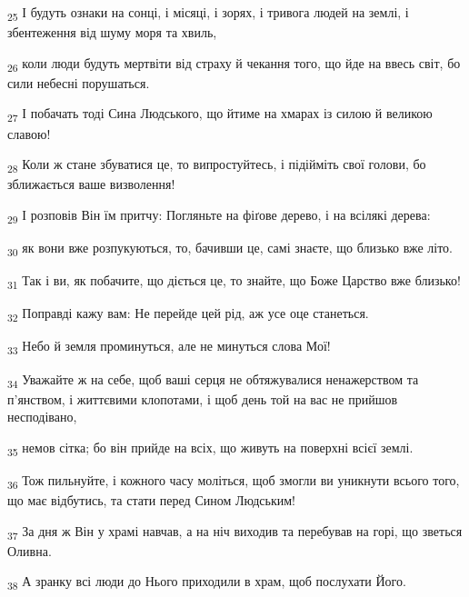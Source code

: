 \begin{tcolorbox}
\textsubscript{25} І будуть ознаки на сонці, і місяці, і зорях, і тривога людей на землі, і збентеження від шуму моря та хвиль,
\end{tcolorbox}
\begin{tcolorbox}
\textsubscript{26} коли люди будуть мертвіти від страху й чекання того, що йде на ввесь світ, бо сили небесні порушаться.
\end{tcolorbox}
\begin{tcolorbox}
\textsubscript{27} І побачать тоді Сина Людського, що йтиме на хмарах із силою й великою славою!
\end{tcolorbox}
\begin{tcolorbox}
\textsubscript{28} Коли ж стане збуватися це, то випростуйтесь, і підійміть свої голови, бо зближається ваше визволення!
\end{tcolorbox}
\begin{tcolorbox}
\textsubscript{29} І розповів Він їм притчу: Погляньте на фіґове дерево, і на всілякі дерева:
\end{tcolorbox}
\begin{tcolorbox}
\textsubscript{30} як вони вже розпукуються, то, бачивши це, самі знаєте, що близько вже літо.
\end{tcolorbox}
\begin{tcolorbox}
\textsubscript{31} Так і ви, як побачите, що діється це, то знайте, що Боже Царство вже близько!
\end{tcolorbox}
\begin{tcolorbox}
\textsubscript{32} Поправді кажу вам: Не перейде цей рід, аж усе оце станеться.
\end{tcolorbox}
\begin{tcolorbox}
\textsubscript{33} Небо й земля проминуться, але не минуться слова Мої!
\end{tcolorbox}
\begin{tcolorbox}
\textsubscript{34} Уважайте ж на себе, щоб ваші серця не обтяжувалися ненажерством та п'янством, і життєвими клопотами, і щоб день той на вас не прийшов несподівано,
\end{tcolorbox}
\begin{tcolorbox}
\textsubscript{35} немов сітка; бо він прийде на всіх, що живуть на поверхні всієї землі.
\end{tcolorbox}
\begin{tcolorbox}
\textsubscript{36} Тож пильнуйте, і кожного часу моліться, щоб змогли ви уникнути всього того, що має відбутись, та стати перед Сином Людським!
\end{tcolorbox}
\begin{tcolorbox}
\textsubscript{37} За дня ж Він у храмі навчав, а на ніч виходив та перебував на горі, що зветься Оливна.
\end{tcolorbox}
\begin{tcolorbox}
\textsubscript{38} А зранку всі люди до Нього приходили в храм, щоб послухати Його.
\end{tcolorbox}
